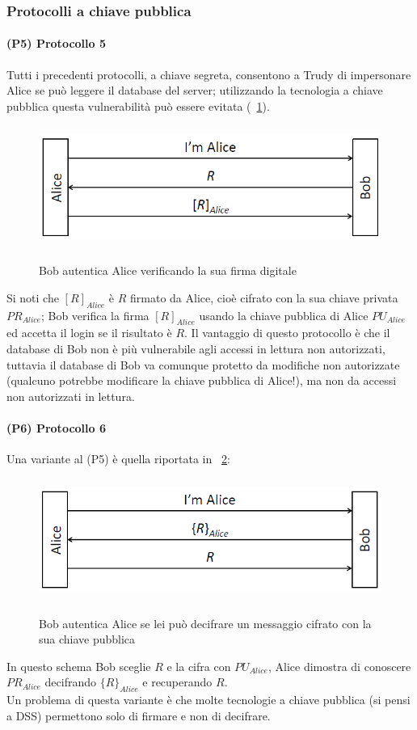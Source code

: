 \subsubsection{Protocolli a chiave pubblica}
\paragraph{(P5) Protocollo 5}
Tutti i precedenti protocolli, a chiave segreta, consentono a Trudy di impersonare Alice se può leggere il database del server; utilizzando la tecnologia a chiave pubblica questa vulnerabilità può essere evitata (\figurename~\ref{fig:ImgS26bis}).
\begin{figure}[htbp]
	\centering%
	\subfigure%
	{\includegraphics[height=4cm, width=12cm, keepaspectratio]{Immagini/autenticazione/ImgS26bis.png}}
	\caption{Bob autentica Alice verificando la sua firma digitale}\label{fig:ImgS26bis} 	
\end{figure}
Si noti che $[R]_{Alice}$ è $R$ firmato da Alice, cioè cifrato con la sua chiave privata $PR_{Alice}$; Bob verifica la firma $[R]_{Alice}$ usando la chiave pubblica di Alice $PU_{Alice}$ ed accetta il login se il risultato è $R$. Il vantaggio di questo protocollo è che il database di Bob non è più vulnerabile agli accessi in lettura non
autorizzati, tuttavia il database di Bob va comunque protetto da modifiche non autorizzate (qualcuno potrebbe modificare la chiave pubblica di Alice!), ma non da accessi non autorizzati in lettura.
\paragraph{(P6) Protocollo 6}
Una variante al (P5) è quella riportata in \figurename~\ref{fig:ImgS28bis}:
\begin{figure}[htbp]
	\centering%
	\subfigure%
	{\includegraphics[height=4cm, width=12cm, keepaspectratio]{Immagini/autenticazione/ImgS28bis.png}}
	\caption{Bob autentica Alice se lei può decifrare un messaggio cifrato con la sua chiave pubblica}\label{fig:ImgS28bis} 	
\end{figure}
In questo schema Bob sceglie $R$ e la cifra con $PU_{Alice}$, Alice dimostra di conoscere $PR_{Alice}$ decifrando $\lbrace R\rbrace_{Alice}$ e recuperando $R$.\\
Un problema di questa variante è che molte tecnologie a chiave pubblica (si pensi a DSS) permettono solo di firmare
e non di decifrare.

